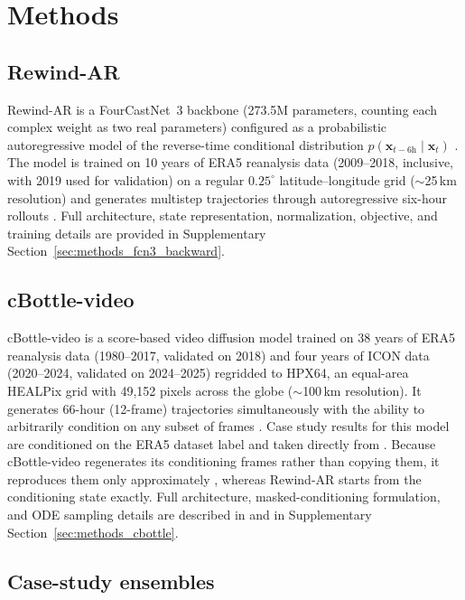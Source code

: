 \documentclass{article}
\begin{document}
\section{Methods}

\subsection{Rewind-AR}

Rewind-AR is a FourCastNet~3 backbone (273.5M parameters, counting each complex weight as two real parameters) configured as a probabilistic autoregressive model of the reverse-time conditional distribution $p(\mathbf{x}_{t-6\mathrm{h}}\mid\mathbf{x}_t)$ \citep{Bonev2025-dw}. The model is trained on 10 years of ERA5 reanalysis data (2009--2018, inclusive, with 2019 used for validation) on a regular $0.25^\circ$ latitude--longitude grid ($\sim$25\,km resolution) and generates multistep trajectories through autoregressive six-hour rollouts \citep{Hersbach2020-oh}. Full architecture, state representation, normalization, objective, and training details are provided in Supplementary Section~\ref{sec:methods_fcn3_backward}.

\subsection{cBottle-video}
\label{sec:methods_cbottle_main}

cBottle-video is a score-based video diffusion model trained on 38 years of ERA5 reanalysis data (1980--2017, validated on 2018) and four years of ICON data (2020--2024, validated on 2024--2025) regridded to HPX64, an equal-area HEALPix grid with 49,152 pixels across the globe ($\sim$100\,km resolution). It generates 66-hour (12-frame) trajectories simultaneously with the ability to arbitrarily condition on any subset of frames \citep{Brenowitz2025-mz, Lin2026-sz}. Case study results for this model are conditioned on the ERA5 dataset label and taken directly from \citet{Lin2026-sz}. Because cBottle-video regenerates its conditioning frames rather than copying them, it reproduces them only approximately \citep{Lin2026-sz}, whereas Rewind-AR starts from the conditioning state exactly. Full architecture, masked-conditioning formulation, and ODE sampling details are described in \citet{Brenowitz2025-mz} and in Supplementary Section~\ref{sec:methods_cbottle}.

\subsection{Case-study ensembles}
\end{document}
